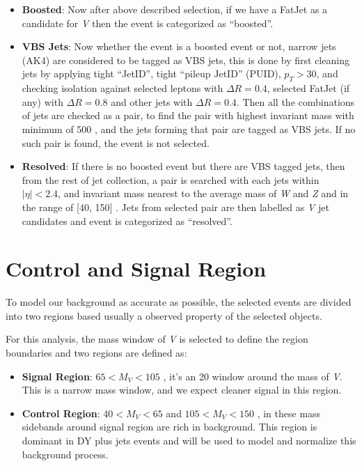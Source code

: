 \begin{itemize}
  \item \textbf{Boosted}: Now after above described selection,
        if we have a FatJet as a candidate for \textit{V} then the event is
        categorized as ``boosted''.
  \item \textbf{VBS Jets}: Now whether the event is a boosted event or not,
        narrow jets (AK4) are considered to be tagged as VBS jets,
        this is done by first cleaning jets by applying tight ``JetID'',
        tight ``pileup JetID'' (PUID),
        \( p_T > 30 \),
        and checking isolation against selected leptons with \(\Delta R = 0.4\),
        selected FatJet (if any) with \( \Delta R = 0.8 \)
        and other jets with \(\Delta R = 0.4\).
        Then all the combinations of jets are checked as a pair,
        to find the pair with highest invariant mass with minimum of 500 \GeV{},
        and the jets forming that pair are tagged as VBS jets.
        If no such pair is found, the event is not selected.
  \item \textbf{Resolved}: If there is no boosted event but there
        are VBS tagged jets, then from the rest of jet collection, a pair
        is searched with each jets within
        \( |\eta| < 2.4 \), and invariant mass nearest to the average mass of \textit{W} and \textit{Z}
        and in the range of [40, 150] \GeV{}.
        Jets from selected pair are then labelled as \textit{V} jet candidates
        and event is categorized as ``resolved''.
\end{itemize}

\section{
  Control and Signal Region
 }

To model our background as accurate as possible,
the selected events are divided into two regions based usually
a observed property of the selected objects.

For this analysis, the mass window of \textit{V} is selected
to define the region boundaries and two regions are defined as:

\begin{itemize}
  \item \textbf{Signal Region}: \( 65 < M_{V} < 105 \) \GeV{},
        it's an 20 \GeV{} window around the mass of \textit{V}. This is a
        narrow mass window, and we expect cleaner signal in this region.
  \item \textbf{Control Region}: \( 40 < M_{V} < 65 \) and \( 105 < M_{V} < 150 \) \GeV{},
        in these mass sidebands around signal region are rich
        in background. This region is dominant in \gls{DY} plus jets
        events and will be used to model and normalize this background process.
\end{itemize}

